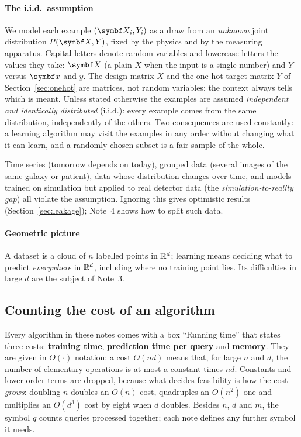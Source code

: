 \documentclass[11pt]{article}
\begin{document}
\paragraph{The i.i.d.\ assumption} We model each example $(\X_i, Y_i)$ as a draw from an \emph{unknown}
joint distribution $P(\X, Y)$, fixed by the physics and by the measuring apparatus. Capital letters denote random
variables and lowercase letters the values they take: $\X$ (a plain $X$ when the input is a single number) and $Y$
versus $\x$ and $y$. The design matrix $X$ and the one-hot target matrix $Y$ of Section~\ref{sec:onehot} are
matrices, not random variables; the context always tells which is meant. Unless stated otherwise the
examples are assumed \emph{independent and identically distributed} (i.i.d.): every example comes from the same
distribution, independently of the others. Two consequences are used constantly: a learning algorithm may visit the
examples in any order without changing what it can learn, and a randomly chosen subset is a fair sample of the
whole.

\begin{keyidea}
Time series (tomorrow depends on today), grouped data (several images of the same galaxy or patient), data whose
distribution changes over time, and models trained on simulation but applied to real detector data (the
\emph{simulation-to-reality gap}) all violate the assumption. Ignoring this gives optimistic results
(Section~\ref{sec:leakage}); Note~4 shows how to split such data.
\end{keyidea}

\paragraph{Geometric picture} A dataset is a cloud of $n$ labelled points in $\mathbb{R}^d$; learning means deciding what to
predict \emph{everywhere} in $\mathbb{R}^d$, including where no training point lies. Its difficulties in large $d$ are the
subject of Note~3.

\subsection{Counting the cost of an algorithm}\label{sec:cost}

Every algorithm in these notes comes with a box ``Running time'' that states three costs: \textbf{training time},
\textbf{prediction time per query} and \textbf{memory}. They are given in $O(\cdot)$ notation: a cost $O(nd)$ means
that, for large $n$ and $d$, the number of elementary operations is at most a constant times $nd$. Constants and
lower-order terms are dropped, because what decides feasibility is how the cost \emph{grows}: doubling $n$ doubles
an $O(n)$ cost, quadruples an $O(n^2)$ one and multiplies an $O(d^3)$ cost by eight when $d$ doubles. Besides $n$,
$d$ and $m$, the symbol $q$ counts queries processed together; each note defines any further symbol it needs.
\end{document}
